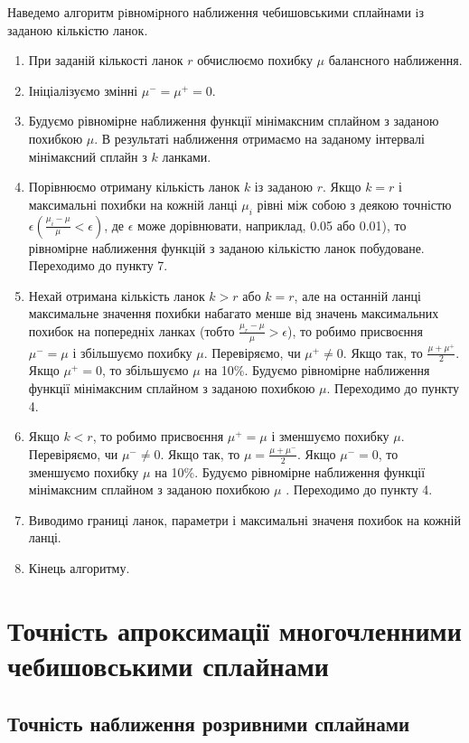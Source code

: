 \documentclass[ukrainian,14pt]{extarticle}
\begin{document}
\newpage
Наведемо алгоритм рiвномiрного наближення чебишовськими сплайнами iз заданою кількістю ланок.
\begin{enumerate}
    \item При заданій кількості ланок $r$ обчислюємо похибку $\mu$ балансного наближення.
    \item Ініціалізуємо змінні $\mu^{-} = \mu^{+} = 0$.
    \item 	Будуємо рівномірне наближення функції мінімаксним сплайном з заданою похибкою $\mu$. В результаті наближення отримаємо на заданому інтервалі мінімаксний сплайн з $k$ ланками.
    \item Порівнюємо отриману кількість ланок $k$ із заданою $r$. Якщо $k = r$ і максимальні похибки на кожній ланці $\mu_i$ рівні між собою з деякою точністю $\epsilon (\frac{\mu_i - \mu}{\mu} < \epsilon)$, де $\epsilon$ може дорівнювати, наприклад, 0.05 або 0.01), то рівномірне наближення функцій з заданою кількістю ланок побудоване. Переходимо до пункту 7.
    \item Нехай отримана кількість ланок $k > r$ або $k = r$, але на останній ланці максимальне значення похибки набагато менше від значень максимальних похибок на попередніх ланках (тобто $\frac{\mu_r - \mu}{\mu} > \epsilon$), то робимо присвоєння $\mu^- = \mu$ і збільшуємо похибку $\mu$. Перевіряємо, чи $\mu^+ \neq 0$. Якщо так, то $\frac{\mu + \mu^+}{2}$. Якщо $\mu^+ = 0$, то збільшуємо $\mu$ на 10\%. Будуємо рівномірне наближення функції мінімаксним сплайном з заданою похибкою $\mu$. Переходимо до пункту 4.
    \item Якщо $k < r$, то робимо присвоєння $\mu^+ = \mu$ і зменшуємо похибку $\mu$. Перевіряємо, чи $\mu^- \neq 0$. Якщо так, то $\mu = \frac{\mu + \mu^-}{2}$. Якщо $\mu^- = 0$, то зменшуємо похибку $\mu$ на 10\%. Будуємо рівномірне наближення функції мінімаксним сплайном з заданою похибкою $\mu$ . Переходимо до пункту 4.
    \item Виводимо границі ланок, параметри і максимальні значеня похибок на кожній ланці.
    \item Кінець алгоритму.
\end{enumerate}

\newpage
\section{Точність апроксимації многочленними чебишовськими сплайнами}

\subsection{Точність наближення розривними сплайнами}
\end{document}
